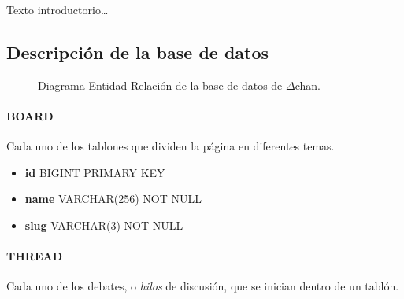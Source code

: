 \documentclass[12pt,a4paper,titlepage]{article}
\newcommand\Dchan{$\Delta$chan}
\begin{document}
    Texto introductorio\dots

    \subsection{Descripción de la base de datos}
    

    \begin{figure}[h]
        \centering
        \caption{Diagrama Entidad-Relación de la base de datos de \Dchan.}
        \label{er:diagram}
    \end{figure}

    \paragraph{BOARD} Cada uno de los tablones que dividen la página en diferentes temas.

    \begin{itemize}
        \item \textbf{id} BIGINT PRIMARY KEY
        \item \textbf{name} VARCHAR(256) NOT NULL
        \item \textbf{slug} VARCHAR(3) NOT NULL
    \end{itemize}

    \paragraph{THREAD} Cada uno de los debates, o \emph{hilos} de discusión, que se inician dentro de un tablón.
\end{document}
